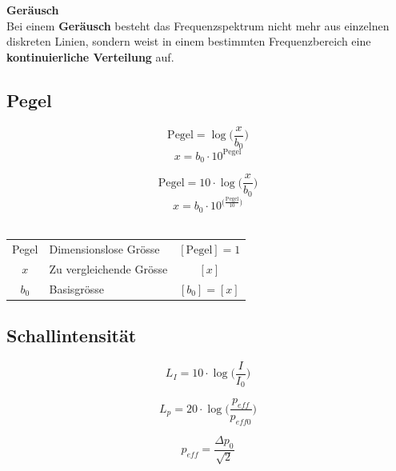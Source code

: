\textbf{Geräusch} \\
Bei einem \textbf{Geräusch} besteht das Frequenzspektrum nicht mehr
aus einzelnen diskreten Linien, sondern weist in einem
bestimmten Frequenzbereich eine  \textbf{kontinuierliche Verteilung} auf. \\




\subsection{Pegel}

\begin{minipage}{0.48\linewidth}
$$ \boxed{ \text{Pegel} = \log \Big( \frac{x}{b_0} \Big) } $$
$$ \boxed{ x = b_0 \cdot 10^{\text{Pegel} } } $$ 

\end{minipage}
\hfill
\begin{minipage}{0.48\linewidth}
$$ \boxed{ \text{Pegel} = 10 \cdot \log \Big( \frac{x}{b_0} \Big) } $$ 
$$ \boxed{ x = b_0 \cdot 10^{\Big( \frac{\text{Pegel}}{10} \Big) } } $$ \\
\end{minipage}

\renewcommand{\arraystretch}{1.3}
\begin{tabular}{clc}
Pegel & Dimensionslose Grösse & $[\text{Pegel}] =  1$ \\
$x$ & Zu vergleichende Grösse & $[x]$ \\
$b_0$ & Basisgrösse & $[b_0] = [x]$ \\
\end{tabular}
\renewcommand{\arraystretch}{1}

\raggedright



\subsection{Schallintensität}

\begin{minipage}{0.48\linewidth}
$$ \boxed{ L_I = 10 \cdot \log \Big( \frac{I}{I_0} \Big) } $$ 
\end{minipage}
\hfill
\begin{minipage}{0.48\linewidth}
$$ \boxed{ L_p = 20 \cdot \log \Big( \frac{p_{eff}}{p_{eff0}} \Big) } $$ 
\end{minipage}

$$ \boxed{ p_{eff} = \frac{\Delta p_0}{\sqrt{2}} } $$ \\

